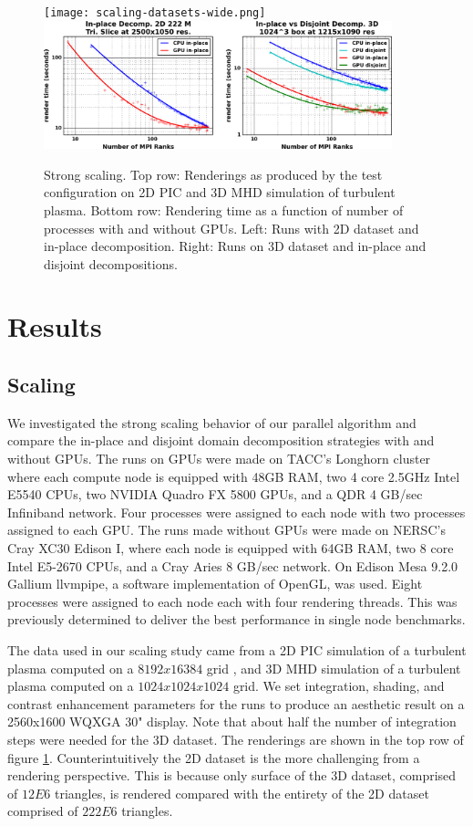 \documentclass[a4paper,10pt]{article}
\begin{document}
\begin{figure}
 \centering
 \texttt{[image: scaling-datasets-wide.png]}\vspace{0.1in}
  \includegraphics[width=0.9\textwidth]{astronum-2014.png}
 \caption{\small Strong scaling. Top row: Renderings as produced by the test configuration on 2D PIC and 3D MHD simulation of turbulent plasma. Bottom row: Rendering time as a function of number of processes with and without GPUs. Left: Runs with 2D dataset and in-place decomposition. Right: Runs on 3D dataset and in-place and disjoint decompositions.}
 \label{fig:scaling}
\end{figure}

\section{Results}
\subsection{Scaling}
We investigated the strong scaling behavior of our parallel algorithm and compare the in-place and disjoint domain decomposition strategies with and without GPUs. The runs on GPUs were made on TACC's Longhorn cluster where each compute node is equipped with 48GB RAM, two 4 core 2.5GHz Intel E5540 CPUs, two NVIDIA Quadro FX 5800 GPUs, and a QDR 4 GB/sec Infiniband network. Four processes were assigned to each node with two processes assigned to each GPU. The runs made without GPUs were made on NERSC's Cray XC30 Edison I, where each node is equipped with 64GB RAM, two 8 core Intel E5-2670 CPUs, and a Cray Aries 8 GB/sec network. On Edison Mesa 9.2.0 Gallium llvmpipe, a software implementation of OpenGL, was used. Eight processes were assigned to each node each with four rendering threads. This was previously determined to deliver the best performance in single node benchmarks\citep{xsede13}.

The data used in our scaling study came from a 2D PIC simulation of a turbulent plasma computed on a $8192x16384$ grid \citep{pop}, and 3D MHD simulation of a turbulent plasma computed on a $1024x1024x1024$ grid. We set integration, shading, and contrast enhancement parameters for the runs to produce an aesthetic result on a 2560x1600 WQXGA 30" display. Note that about half the number of integration steps were needed for the 3D dataset. The renderings are shown in the top row of figure \ref{fig:scaling}. Counterintuitively the 2D dataset is the more challenging from a rendering perspective. This is because only surface of the 3D dataset, comprised of $12E6$ triangles, is rendered compared with the entirety of the 2D dataset comprised of $222E6$ triangles.
\end{document}
